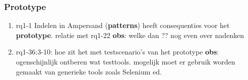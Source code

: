 \subsubsection{Prototype}
\begin{comment}
plaats hier de afgehandelde items.
\end{comment}
\begin{enumerate}
    \item rq1-1 Indelen in Ampersand (\textbf{patterns}) heeft consequenties voor het \textbf{prototype}. relatie met rq1-22
    \newline\textbf{obs}: welke dan ?? nog even over nadenken
    
    \item rq1-36:3-10: hoe zit het met testscenario's van het prototype
    \newline\textbf{obs}: ogenschijnlijk ontberen wat testtools. mogelijk moet er gebruik worden gemaakt van generieke tools zoals Selenium ed.

\end{enumerate}

